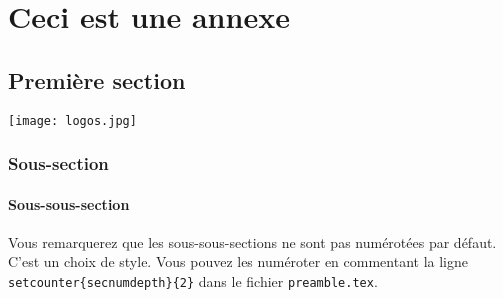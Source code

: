 \chapter{Ceci est une annexe}

\section{Première section}

\texttt{[image: logos.jpg]}

\subsection{Sous-section}

\subsubsection{Sous-sous-section}
Vous remarquerez que les sous-sous-sections ne sont pas numérotées par défaut. C'est un choix de style. Vous pouvez les numéroter en commentant la ligne \texttt{\\setcounter\{secnumdepth\}\{2\}} dans le fichier \texttt{preamble.tex}.
\lipsum[1-5]
